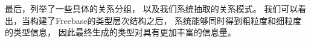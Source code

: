 
%
%
%
%
%
%

最后，列举了一些具体的关系分组，
以及我们系统抽取的关系模式。
我们可以看出，当构建了Freebase的类型层次结构之后，
系统能够同时得到粗粒度和细粒度的类型信息，
因此最终生成的类型对具有更加丰富的信息量。


